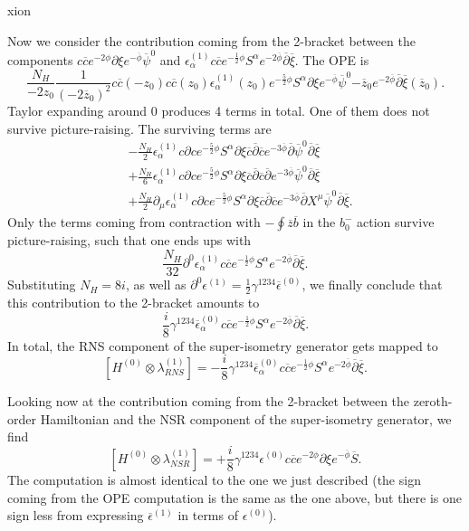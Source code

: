 xion\documentclass[12pt]{article}
\def\be{\begin{equation}}
\def\ee{\end{equation}}
\numberwithin{equation}{section}
\newcommand{\B}[1]{\overline{#1}}
\begin{document}
Now we consider the contribution coming from the 2-bracket between the components $c\B{c}e^{-2\phi}\partial\xi e^{-\B{\phi}}\B{\psi}^{0}$ and $\epsilon^{(1)}_{\alpha}c\B{c}e^{-\frac{1}{2}\phi}S^{\alpha}e^{-2\B{\phi}}\B{\partial}\B{\xi}$. The OPE is
\be
	\frac{N_{H}}{-2z_{0}}\frac{1}{(-2\B{z}_{0})^{2}}c\B{c}(-z_{0})c\B{c}(z_{0})\epsilon^{(1)}_{\alpha}(z_{0})e^{-\frac{5}{2}\phi}S^{\alpha}\partial\xi e^{-\B{\phi}}\B{\psi}^{0}{-\B{z}_{0}}e^{-2\B{\phi}}\B{\partial}\B{\xi}(\B{z}_{0}).
\ee
Taylor expanding around $0$ produces 4 terms in total. One of them does not survive picture-raising. The surviving terms are
\be
\begin{split}
	&-\frac{N_{H}}{2}\epsilon^{(1)}_{\alpha}c\partial ce^{-\frac{5}{2}\phi}S^{\alpha}\partial\xi \B{c}\B{\partial}\B{c}e^{-3\B{\phi}}\B{\partial}\B{\psi}^{0}\B{\partial}\B{\xi}\\
	&+\frac{N_{H}}{6}\epsilon^{(1)}_{\alpha}c\partial ce^{-\frac{5}{2}\phi}S^{\alpha}\partial\xi \B{c}\B{\partial}\B{c}\B{\partial}e^{-3\B{\phi}}\B{\psi}^{0}\B{\partial}\B{\xi}\\
	&+\frac{N_{H}}{2}\partial_{\mu}\epsilon^{(1)}_{\alpha}c\partial ce^{-\frac{5}{2}\phi}S^{\alpha}\partial\xi \B{c}\B{\partial}\B{c}e^{-3\B{\phi}}\B{\partial}X^{\mu}\B{\psi}^{0}\B{\partial}\B{\xi}.
\end{split}
\ee
Only the terms coming from contraction with $-\oint\B{z}\B{b}$ in the $b_{0}^{-}$ action survive picture-raising, such that one ends ups with
\be
	\frac{N_{H}}{32}\partial^{0}\epsilon^{(1)}_{\alpha}c\B{c}e^{-\frac{1}{2}\phi}S^{\alpha}e^{-2\B{\phi}}\B{\partial}\B{\xi}.
\ee
Substituting $N_{H}=8i$, as well as $\partial^{0}\epsilon^{(1)}=\frac{1}{2}\gamma^{1234}\B{\epsilon}^{(0)}$, we finally conclude that this contribution to the 2-bracket amounts to
\be
	\frac{i}{8}\gamma^{1234}\B{\epsilon}^{(0)}_{\alpha}c\B{c}e^{-\frac{1}{2}\phi}S^{\alpha}e^{-2\B{\phi}}\B{\partial}\B{\xi}.
\ee
In total, the RNS component of the super-isometry generator gets mapped to
\be \label{H0RNS1}
	[H^{(0)}\otimes\lambda^{(1)}_{RNS}]=-\frac{i}{8}\gamma^{1234}\B{\epsilon}_{\alpha}^{(0)}c\B{c}e^{-\frac{1}{2}\phi}S^{\alpha}e^{-2\B{\phi}}\B{\partial}\B{\xi}.
\ee

Looking now at the contribution coming from the 2-bracket between the zeroth-order Hamiltonian and the NSR component of the super-isometry generator, we find
\be \label{H0NSR1}
	[H^{(0)}\otimes\lambda^{(1)}_{NSR}]=+\frac{i}{8}\gamma^{1234}{\epsilon}^{(0)}c\B{c}e^{-2\phi}\partial\xi e^{-\B{\phi}}\B{S}.
\ee
The computation is almost identical to the one we just described (the sign coming from the OPE computation is the same as the one above, but there is one sign less from expressing $\B{\epsilon}^{(1)}$ in terms of $\epsilon^{(0)}$).
\end{document}
